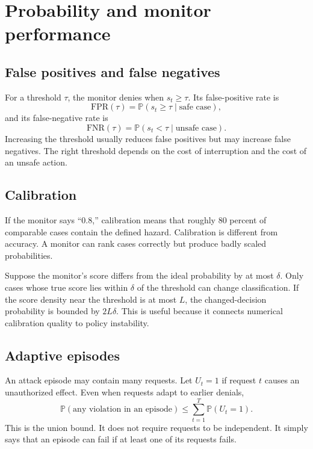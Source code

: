 \documentclass[11pt]{article}
\newcommand{\Prob}{\mathbb{P}}
\begin{document}
\section{Probability and monitor performance}

\subsection{False positives and false negatives}
For a threshold $\tau$, the monitor denies when $s_t\ge\tau$. Its false-positive rate is
\begin{equation}
 \mathrm{FPR}(\tau)=\Prob(s_t\ge\tau\mid\text{safe case}),
\end{equation}
and its false-negative rate is
\begin{equation}
 \mathrm{FNR}(\tau)=\Prob(s_t<\tau\mid\text{unsafe case}).
\end{equation}
Increasing the threshold usually reduces false positives but may increase false negatives. The right threshold depends on the cost of interruption and the cost of an unsafe action.

\subsection{Calibration}
If the monitor says ``0.8,'' calibration means that roughly 80 percent of comparable cases contain the defined hazard. Calibration is different from accuracy. A monitor can rank cases correctly but produce badly scaled probabilities.

Suppose the monitor's score differs from the ideal probability by at most $\delta$. Only cases whose true score lies within $\delta$ of the threshold can change classification. If the score density near the threshold is at most $L$, the changed-decision probability is bounded by $2L\delta$. This is useful because it connects numerical calibration quality to policy instability.

\subsection{Adaptive episodes}
An attack episode may contain many requests. Let $U_t=1$ if request $t$ causes an unauthorized effect. Even when requests adapt to earlier denials,
\begin{equation}
 \Prob(\text{any violation in an episode})
 \le \sum_{t=1}^{T}\Prob(U_t=1).
\end{equation}
This is the union bound. It does not require requests to be independent. It simply says that an episode can fail if at least one of its requests fails.
\end{document}
